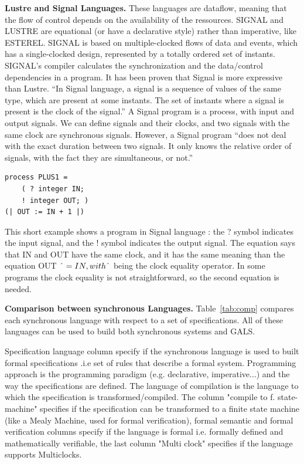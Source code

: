 \bigskip
\noindent\textbf{Lustre and Signal Languages.} 
These languages are dataflow, meaning that the flow of control depends on the availability of the ressources. SIGNAL and LUSTRE are equational (or have a declarative style) rather than imperative, like ESTEREL. SIGNAL is based on multiple-clocked flows of data and events, which has a  single-clocked design, represented by a totally ordered set of instants. SIGNAL’s compiler calculates the synchronization and the data/control dependencies in a program. It has been proven that Signal is more expressive than Lustre.
“In Signal language, a signal is a sequence of values of the same type, which are present at
some instants. The set of instants where a signal is present is the clock of the signal.” \cite{signalTutoring}
A Signal program is a process, with input and output signals. We can define signals and their clocks, and two signals with the same clock are synchronous signals. However, a Signal program “does not deal with the exact duration between two signals. It only knows the relative order of signals, with the fact they are simultaneous, or not.”\cite{signalTutoring}

\begin{tcolorbox}[
        boxrule=0pt,
        sharp corners]
    \begin{verbatim}
process PLUS1 =
    ( ? integer IN;
    ! integer OUT; )
(| OUT := IN + 1 |)
    \end{verbatim}
\end{tcolorbox}

This short example shows a program in Signal language : the ? symbol indicates the input signal, and the ! symbol indicates the output signal. The equation says that IN and OUT have the same clock, and it has the same meaning than the equation OUT
 $\string ^ = IN, with \string ^$ being the clock equality operator. In some programs the clock equality is not straightforward, so the second equation is needed.

\bigskip
\noindent\textbf{Comparison between synchronous Languages.}
Table~\ref{tab:comp} compares each synchronous language with respect to a set of specifications. All of these languages can be used to build both synchronous systems and GALS. 

Specification language column specify if the synchronous language is used to built formal specifications .i.e set of rules that describe a formal system. Programming approach is the programming paradigm (e.g. declarative, imperative...) and the way the specifications are defined. The language of compilation is the language to which the specification is transformed/compiled. The column "compile to f. state-machine" specifies if the specification can be transformed to a finite state machine (like a Mealy  Machine, used for formal verification), formal semantic and formal verification columns specify if the language is formal i.e. formally defined and mathematically verifiable, the last column "Multi clock" specifies if the language supports Multiclocks.  

